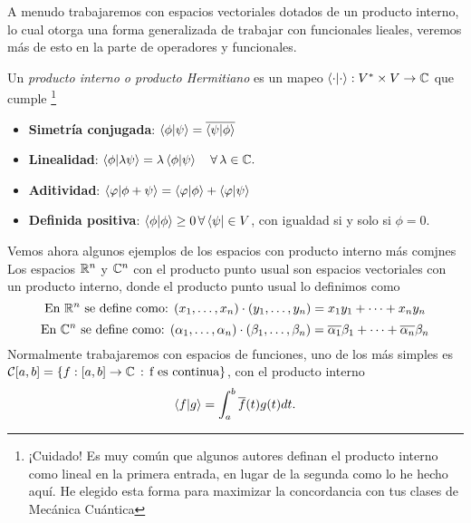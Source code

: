 \documentclass[main.tex]{subfiles}
\begin{document}
A menudo trabajaremos con espacios vectoriales dotados de un producto interno, lo cual otorga una forma generalizada de trabajar con funcionales lieales, veremos más de esto en la parte de operadores y funcionales.
\begin{def.}
Un \emph{producto interno o producto Hermitiano} es un mapeo \( \braket{\cdot|\cdot} : V^{*} \times V \to \mathbb C \) que cumple \footnote{¡Cuidado! Es muy común que algunos autores definan el producto interno como lineal en la primera entrada, en lugar de la segunda como lo he hecho aquí. He elegido esta forma para maximizar la concordancia con tus clases de Mecánica Cuántica}

\begin{itemize}
    \item \textbf{Simetría conjugada}: \(\braket{\phi | \psi} = \overline{\braket{\psi | \phi}}\)
    \item \textbf{Linealidad}: \(\braket{\phi | \lambda \psi} = \lambda\braket{\phi|\psi}\quad\forall\,\lambda\in\mathbb C .\)
    \item \textbf{Aditividad}: \(\braket{\varphi | \phi + \psi} = \braket{\varphi | \phi} + \braket{\varphi|\psi}\)
    \item \textbf{Definida positiva}: \(\braket{\phi | \phi} \geq 0\,\forall \bra{\psi} \in V\), con igualdad si y solo si \(\phi = 0\).
\end{itemize}
\end{def.}
Vemos ahora algunos ejemplos de los espacios con producto interno más comjnes
\eje Los espacios \(\mathbb R ^n\) y \(\mathbb C ^n\) con el producto punto usual son espacios vectoriales con un producto interno, donde el producto punto usual lo definimos como
\[
\text{En \(\ensuremath{\mathbb R }^n\) se define como: }(x_1,\dots,x_n)\cdot(y_1,\dots,y_n)=x_1y_1+\dots+x_ny_n
\]
\[
\text{En \(\ensuremath{\mathbb C }^n\) se define como: }(\alpha_1,\dots,\alpha_n)\cdot(\beta_1,\dots,\beta_n)=\overline{\alpha_1}\beta_1+\dots+\overline{\alpha_n}\beta_n
\]
\eje Normalmente trabajaremos con espacios de funciones, uno de los más simples es \(\mathcal{C}[a,b]=\{f:[a,b]\rightarrow\mathbb C \,:\,\text{f es continua}\}\), con el producto interno
\[
\braket{f|g}=\int_a^b\overline{f}(t)g(t)dt.
\]
\end{document}
